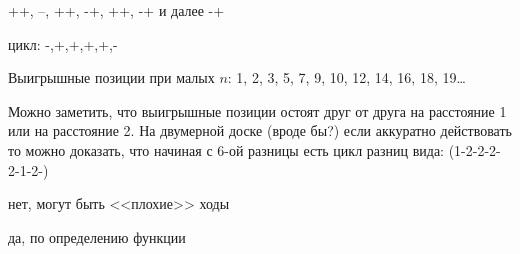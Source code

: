 \begin{solution}{3.1}
 ++, --, ++, -+, ++, -+ и далее -+
\end{solution}
\begin{solution}{3.2}
 цикл: -,+,+,+,+,-
\end{solution}
\begin{solution}{3.3}

\end{solution}
\begin{solution}{3.4}

\end{solution}
\begin{solution}{3.5}

\end{solution}
\begin{solution}{3.6}
\end{solution}
\begin{solution}{3.7}

\end{solution}
\begin{solution}{3.8}
Выигрышные позиции при малых $n$: 1, 2, 3, 5, 7, 9, 10, 12, 14, 16, 18, 19\ldots

Можно заметить, что выигрышные позиции остоят друг от друга на расстояние 1 или на расстояние 2. На двумерной доске (вроде бы?)  если аккуратно действовать то можно доказать, что начиная с 6-ой разницы есть цикл разниц вида: (1-2-2-2-2-1-2-)
\end{solution}
\begin{solution}{3.9}

\end{solution}
\begin{solution}{3.10}

\end{solution}
\begin{solution}{3.11}

\end{solution}
\begin{solution}{3.12}

\end{solution}
\begin{solution}{3.13}
\item нет, могут быть <<плохие>> ходы \par
\item да, по определению функции
\end{solution}
\begin{solution}{3.14}

\end{solution}
